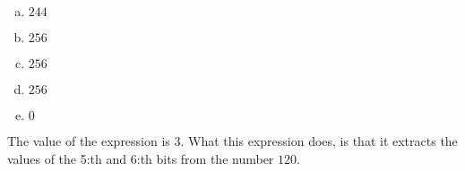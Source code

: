 \begin{Answer}[ref={bitnot}]
  \begin{enumerate}[(a)]
  \item $244$
  \item $256$
  \item $256$
  \item $256$
  \item $0$
  \end{enumerate}
\end{Answer}

\begin{Answer}[ref={bit-shiting}]

  The value of the expression is $3$. What this expression does, is
  that it extracts the values of the 5:th and 6:th bits from the
  number $120$.

\end{Answer}

\begin{Answer}[ref={bitcount}]

  \begin{algorithmic}[1]

        \State {}
        \EndIf
      \EndFor

    \EndProcedure
  \end{algorithmic}

\end{Answer}

